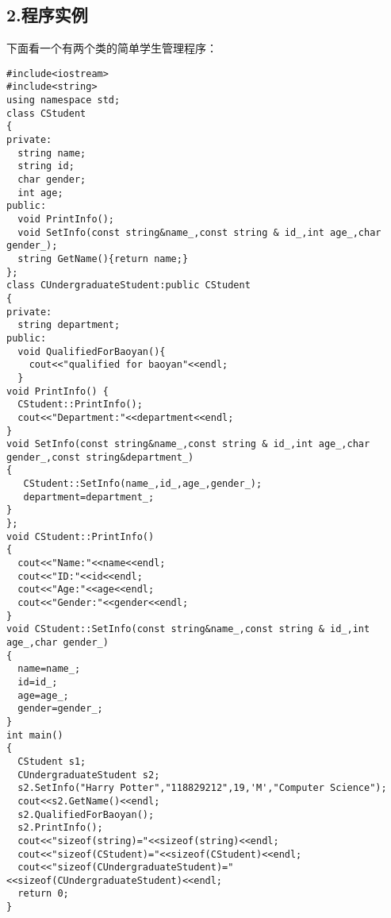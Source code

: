 \documentclass{article}
\begin{document}
\begin{CJK}{UTF8}{gbsn}
\section*{2.程序实例}
下面看一个有两个类的简单学生管理程序：
\begin{verbatim}
#include<iostream>
#include<string>
using namespace std;
class CStudent
{
private:
  string name;
  string id;
  char gender;
  int age;
public:
  void PrintInfo();
  void SetInfo(const string&name_,const string & id_,int age_,char gender_);
  string GetName(){return name;}
};
class CUndergraduateStudent:public CStudent
{
private:
  string department;
public:
  void QualifiedForBaoyan(){
    cout<<"qualified for baoyan"<<endl;
  }
void PrintInfo() {
  CStudent::PrintInfo();
  cout<<"Department:"<<department<<endl;
}
void SetInfo(const string&name_,const string & id_,int age_,char gender_,const string&department_)
{
   CStudent::SetInfo(name_,id_,age_,gender_);
   department=department_;
}
};
void CStudent::PrintInfo()
{
  cout<<"Name:"<<name<<endl;
  cout<<"ID:"<<id<<endl;
  cout<<"Age:"<<age<<endl;
  cout<<"Gender:"<<gender<<endl;
}
void CStudent::SetInfo(const string&name_,const string & id_,int age_,char gender_)
{
  name=name_;
  id=id_;
  age=age_;
  gender=gender_;
}
int main()
{
  CStudent s1;
  CUndergraduateStudent s2;
  s2.SetInfo("Harry Potter","118829212",19,'M',"Computer Science");
  cout<<s2.GetName()<<endl;
  s2.QualifiedForBaoyan();
  s2.PrintInfo();
  cout<<"sizeof(string)="<<sizeof(string)<<endl;
  cout<<"sizeof(CStudent)="<<sizeof(CStudent)<<endl;
  cout<<"sizeof(CUndergraduateStudent)="<<sizeof(CUndergraduateStudent)<<endl;
  return 0;
}
\end{verbatim}
\end{CJK}
\end{document}
